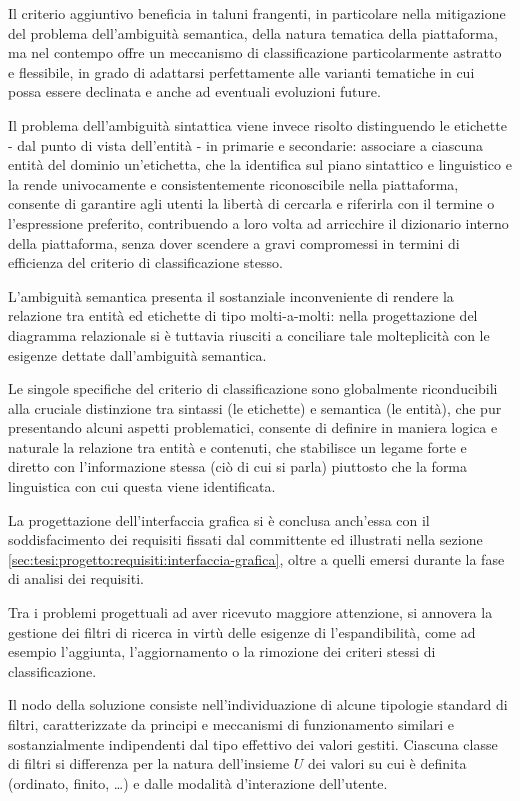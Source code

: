 Il criterio aggiuntivo beneficia in taluni frangenti, in particolare nella mitigazione del problema dell'ambiguità semantica, della natura tematica della piattaforma, ma nel contempo offre un meccanismo di classificazione particolarmente astratto e flessibile, in grado di adattarsi perfettamente alle varianti tematiche in cui possa essere declinata e anche ad eventuali evoluzioni future.

Il problema dell'ambiguità sintattica viene invece risolto distinguendo le etichette - dal punto di vista dell'entità - in primarie e secondarie: associare a ciascuna entità del dominio un'etichetta, che la identifica sul piano sintattico e linguistico e la rende univocamente e consistentemente riconoscibile nella piattaforma, consente di garantire agli utenti la libertà di cercarla e riferirla con il termine o l'espressione preferito, contribuendo a loro volta ad arricchire il dizionario interno della piattaforma, senza dover scendere a gravi compromessi in termini di efficienza del criterio di classificazione stesso.

L'ambiguità semantica presenta il sostanziale inconveniente di rendere la relazione tra entità ed etichette di tipo molti-a-molti: nella progettazione del diagramma relazionale si è tuttavia riusciti a conciliare tale molteplicità con le esigenze dettate dall'ambiguità semantica.

Le singole specifiche del criterio di classificazione sono globalmente riconducibili alla cruciale distinzione tra sintassi (le etichette) e semantica (le entità), che pur presentando alcuni aspetti problematici, consente di definire in maniera logica e naturale la relazione tra entità e contenuti, che stabilisce un legame forte e diretto con l'informazione stessa (ciò di cui si parla) piuttosto che la forma linguistica con cui questa viene identificata.

La progettazione dell'interfaccia grafica si è conclusa anch'essa con il soddisfacimento dei requisiti fissati dal committente ed illustrati nella sezione \ref{sec:tesi:progetto:requisiti:interfaccia-grafica}, oltre a quelli emersi durante la fase di analisi dei requisiti.

Tra i problemi progettuali ad aver ricevuto maggiore attenzione, si annovera la gestione dei filtri di ricerca in virtù delle esigenze di l'espandibilità, come ad esempio l'aggiunta, l'aggiornamento o la rimozione dei criteri stessi di classificazione.

Il nodo della soluzione consiste nell'individuazione di alcune tipologie standard di filtri, caratterizzate da principi e meccanismi di funzionamento similari e sostanzialmente indipendenti dal tipo effettivo dei valori gestiti. Ciascuna classe di filtri si differenza per la natura dell'insieme $U$ dei valori su cui è definita (ordinato, finito, \ldots) e dalle modalità d'interazione dell'utente. %

